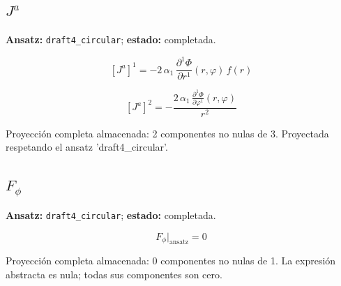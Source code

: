 \documentclass[11pt]{article}
\begin{document}
\subsection*{$ J^a $}
\textbf{Ansatz:} \texttt{draft4\_circular}; \textbf{estado:} completada.\par
\begin{dmath*}[breakdepth={5}]
\left[J^a\right]^{1} = -2\,\alpha_{1}\,\frac{\partial^{1} \Phi}{\partial r^{1}}\!\left(r, \varphi\right)\,f\!\left(r\right)
\end{dmath*}
\par\smallskip
\begin{dmath*}[breakdepth={5}]
\left[J^a\right]^{2} = -\frac{2\,\alpha_{1}\,\frac{\partial^{1} \Phi}{\partial \varphi^{1}}\!\left(r, \varphi\right)}{{r}^{2}}
\end{dmath*}
\par\smallskip
Proyección completa almacenada: 2 componentes no nulas de 3. Proyectada respetando el ansatz 'draft4\_circular'.\par\medskip
{}
\subsection*{$ F_{\phi} $}
\textbf{Ansatz:} \texttt{draft4\_circular}; \textbf{estado:} completada.\par
\begin{dmath*}[breakdepth={5}]
F_{\phi}\big|_{\mathrm{ansatz}} = 0
\end{dmath*}
\par\smallskip
Proyección completa almacenada: 0 componentes no nulas de 1. La expresión abstracta es nula; todas sus componentes son cero.\par\medskip
{}
\end{document}
